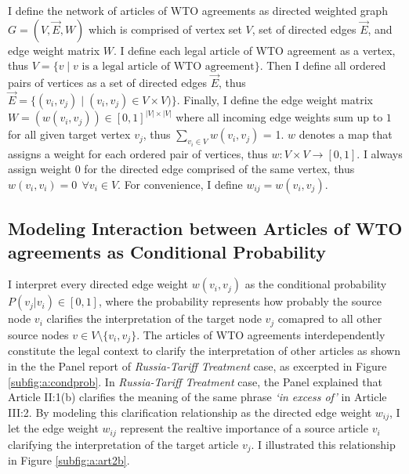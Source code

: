 I define the network of articles of WTO agreements as directed weighted graph $G=(V, \vec{E}, W)$ which is comprised of 
vertex set $V$, set of directed edges $\vec{E}$, and edge weight matrix $W$. I define each legal article of WTO agreement as a vertex, thus
$V=\{v \mid v\text{ is a legal article of WTO agreement\}}$. Then I define all ordered pairs of vertices as a set of directed edges $\vec{E}$, thus
$\vec{E} = \{(v_i, v_j) \mid (v_i, v_j)\in V \times V)\}$. 
Finally, I define the edge weight matrix $W=(w(v_i, v_j)) \in [0,1]^{|V| \times |V|}$ where all incoming edge weights sum up to $1$ for all given target vertex $v_j$, thus
$\sum_{v_i\in V}{w(v_i, v_j)}$ = 1. $w$ denotes a map that assigns a weight for each ordered pair of vertices, thus $w : V \times V \to [0,1]$. 
I always assign weight $0$ for the directed edge comprised of the same vertex, thus  $w(v_i, v_i) = 0 \:\: \forall{v_i \in V}$.
For convenience, I define $w_{ij} = w(v_i, v_j)$.


\subsection{Modeling Interaction between Articles of WTO agreements as Conditional Probability}
I interpret every directed edge weight $w(v_i, v_j)$ as the conditional probability $P(v_j|v_i) \in [0,1]$, where the probability represents how probably the source node $v_i$ clarifies the interpretation of the target node $v_j$ comapred to all other source nodes $v\in V \setminus \{v_i, v_{j}\}$. 
The articles of WTO agreements interdependently constitute the legal context to clarify the interpretation of other articles as shown in the the Panel report of \textit{Russia-Tariff Treatment} case, as excerpted in Figure \ref{subfig:a:condprob}. In \textit{Russia-Tariff Treatment} case, the Panel explained that Article II:1(b) clarifies the meaning of the same phrase \textit{`in excess of'} in Article III:2.
By modeling this clarification relationship as the directed edge weight $w_{ij}$, I let the edge weight $w_{ij}$ represent the realtive importance of a source article $v_i$ clarifying the interpretation of the target article $v_j$. I illustrated this relationship in Figure \ref{subfig:a:art2b}.

